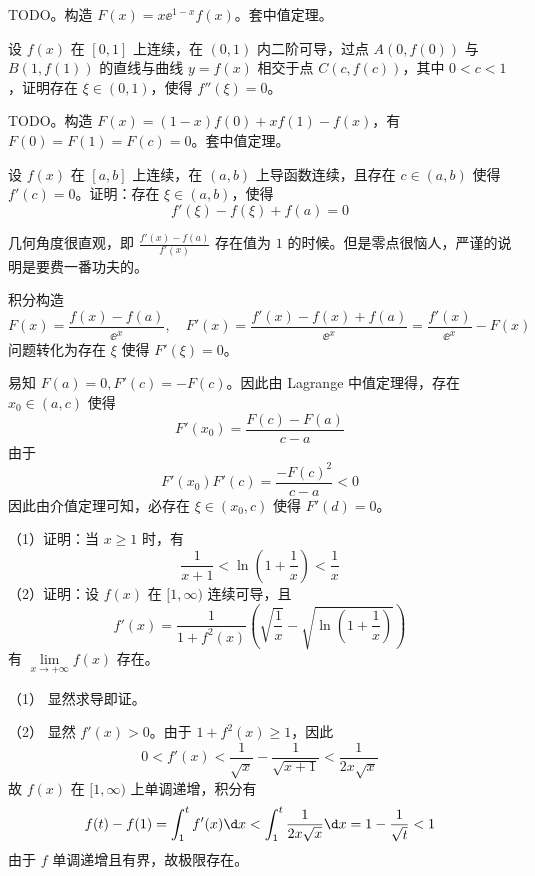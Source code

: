 \begin{solution}
	TODO。构造 $F(x) = x \ee^{1-x} f(x)$。套中值定理。
\end{solution}

\begin{problem}[000013]
设 $f(x)$ 在 $[0, 1]$ 上连续，在 $(0, 1)$ 内二阶可导，过点 $A(0, f(0))$ 与 $B(1, f(1))$ 的直线与曲线 $y=f(x)$ 相交于点 $C(c, f(c))$，其中 $0 < c < 1$，证明存在 $\xi \in (0, 1)$，使得 $f''(\xi) = 0$。
\end{problem}

\begin{solution}
	TODO。构造 $F(x) = (1-x)f(0) + xf(1) - f(x)$，有 $F(0) = F(1) = F(c) = 0$。套中值定理。
\end{solution}

\begin{problem}[000016]
设 $f(x)$ 在 $[a, b]$ 上连续，在 $(a, b)$ 上导函数连续，且存在 $c \in (a, b)$ 使得 $f'(c) = 0$。证明：存在 $\xi \in (a, b)$，使得
\[ f'(\xi) - f(\xi) + f(a) = 0 \]
\end{problem}

\begin{solution}
	几何角度很直观，即 $\frac{f'(x) - f(a)}{f'(x)}$ 存在值为 $1$ 的时候。但是零点很恼人，严谨的说明是要费一番功夫的。

	积分构造
	\[ F(x) = \frac{f(x) - f(a)}{\ee^x}, \quad F'(x) = \frac{f'(x) - f(x) + f(a)}{\ee^x} = \frac{f'(x)}{\ee^x} - F(x) \]
	问题转化为存在 $\xi$ 使得 $F'(\xi) = 0$。

	易知 $F(a) = 0, F'(c) = -F(c)$。因此由 Lagrange 中值定理得，存在 $x_0 \in (a, c)$ 使得
	\[ F'(x_0) = \frac{F(c) - F(a)}{c - a} \]
	由于
	\[ F'(x_0) F'(c) = \frac{-F(c)^2}{c- a} < 0 \]
	因此由介值定理可知，必存在 $\xi \in (x_0, c)$ 使得 $F'(d) = 0$。
\end{solution}

\begin{problem}[000018]
（1）证明：当 $x \geqslant 1$ 时，有
\[ \frac{1}{x+1} < \ln\left(1 + \frac{1}{x}\right) < \frac{1}{x} \]
（2）证明：设 $f(x)$ 在 $[1, \infty)$ 连续可导，且
\[ f'(x) = \frac{1}{1 + f^2(x)} \left( \sqrt{\frac{1}{x}} - \sqrt{\ln\left(1 + \frac{1}{x}\right)} \right) \]
有 $\lim\limits_{x \to +\infty} f(x)$ 存在。
\end{problem}

\begin{solution}
	（1） 显然求导即证。

	（2） 显然 $f'(x) > 0$。由于 $1 + f^2(x) \geqslant 1$，因此
	\[ 0 < f'(x) < \frac{1}{\sqrt{x}} - \frac{1}{\sqrt{x+1}} < \frac{1}{2 x \sqrt{x}} \]
	故 $f(x)$ 在 $[1, \infty)$ 上单调递增，积分有
	\[ f(t) - f(1) = \int_{1}^{t} f'(x) \d x < \int_{1}^{t} \frac{1}{2 x \sqrt{x}} \d x = 1 - \frac{1}{\sqrt{t}} < 1 \]
	由于 $f$ 单调递增且有界，故极限存在。
\end{solution}

